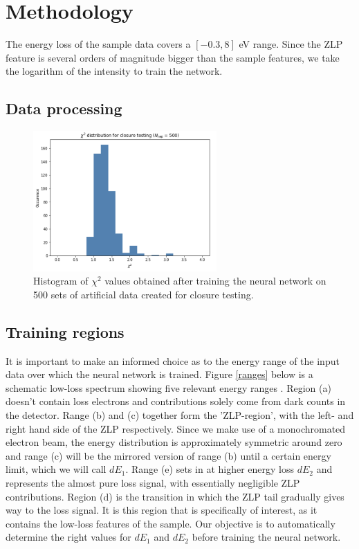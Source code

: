 \documentclass[11pt,a4paper]{article}
\numberwithin{equation}{section}
\numberwithin{figure}{section}
\numberwithin{table}{section}
\begin{document}
\section{Methodology}

The energy loss of the sample data covers a $[-0.3, 8]$ eV range. Since the ZLP feature is several orders of magnitude bigger than the sample features, we take the logarithm of the intensity to train the network. 
 
\subsection{Data processing}
\begin{figure}[H]
    \centering
    \includegraphics[width=70mm]{plots/closure.png}
    \caption{Histogram of $\chi^2$ values obtained after training the neural network on 500 sets of artificial data created for closure testing.}
    \label{closure2}
\end{figure}

\subsection{Training regions}
It is important to make an informed choice as to the energy range of the input data over which the neural network is trained. Figure \ref{ranges} below is a schematic low-loss spectrum showing five relevant energy ranges \cite{reed}. Region (a) doesn't contain loss electrons and contributions solely come from dark counts in the detector. Range (b) and (c) together form the 'ZLP-region', with the left- and right hand side of the ZLP respectively. Since we make use of a monochromated electron beam, the energy distribution is approximately symmetric around zero and range (c) will be the mirrored version of range (b) until a certain energy limit, which we will call $dE_1$. Range (e) sets in at higher energy loss $dE_2$ and represents the almost pure loss signal, with essentially negligible ZLP contributions. Region (d) is the transition in which the ZLP tail gradually gives way to the loss signal. It is this region that is specifically of interest, as it contains the low-loss features of the sample.  Our objective is to automatically determine the right values for $dE_1$ and $dE_2$ before training the neural network.
\end{document}
